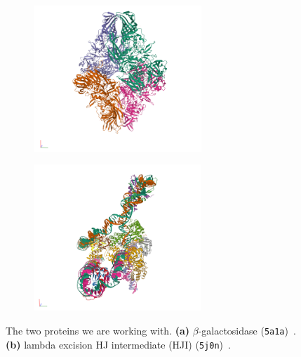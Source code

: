 \begin{figure}[ht!]
    \centering
    \begin{subfigure}[b]{0.45\textwidth}
        \includegraphics[height=5.5cm]{figures/5a1a_pdb.png}
        \caption{}
    \end{subfigure}
    \begin{subfigure}[b]{0.45\textwidth}
    \centering
        \includegraphics[height=5.5cm]{figures/5j0n_pdb.png}
        \caption{}
    \end{subfigure}

    \caption{%
        The two proteins we are working with.
        \textbf{(a)} $\beta$-galactosidase (\texttt{5a1a})~\cite{5a1a_pdb}.
        \textbf{(b)} lambda excision HJ intermediate (HJI) (\texttt{5j0n})~\cite{5j0n_pdb}.
    }\label{fig:pdb-proteins}
\end{figure}


